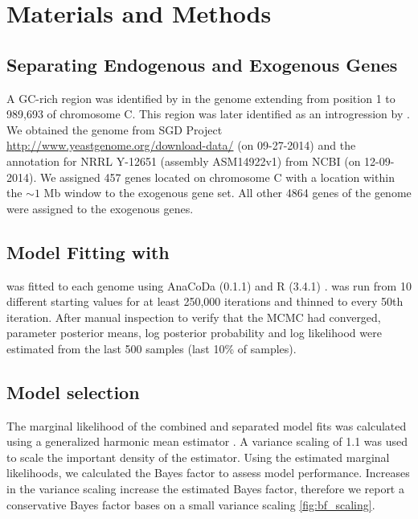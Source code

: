 \documentclass[fleqn,letterpaper]{article}
\begin{document}




\section*{Materials and Methods}

\subsection*{Separating Endogenous and Exogenous Genes}
A GC-rich region was identified by \citet{payen2009} in the \kluyveri genome extending from position 1 to 989,693 of chromosome C.
This region was later identified as an introgression by \citet{friedrich2015}.
We obtained the \kluyveri genome from SGD Project \url{http://www.yeastgenome.org/download-data/} (on 09-27-2014) and the annotation for \kluyveri NRRL Y-12651 (assembly ASM14922v1) from NCBI (on 12-09-2014).
We assigned 457 genes located on chromosome C with a location within the $\sim 1$ Mb window to the exogenous gene set.
All other 4864 genes of the \kluyveri genome were assigned to the exogenous genes.

\subsection*{Model Fitting with \ROC}
\ROC was fitted to each genome using AnaCoDa (0.1.1) \citep{landerer2018} and R (3.4.1) \citep{rcore}.
\ROC was run from 10 different starting values for at least 250,000 iterations and thinned to every 50th iteration.
After manual inspection to verify that the MCMC had converged, parameter posterior means, log posterior probability and log likelihood were estimated from the last 500 samples (last 10\% of samples).

\subsection*{Model selection}
The marginal likelihood of the combined and separated model fits was calculated using a generalized harmonic mean estimator \citep{Gronau2017}. A variance scaling of 1.1 was used to scale the important density of the estimator. Using the estimated marginal likelihoods, we calculated the Bayes factor to assess model performance. 
Increases in the variance scaling increase the estimated Bayes factor, therefore we report a conservative Bayes factor bases on a small variance scaling \ref{fig:bf_scaling}.
\end{document}
